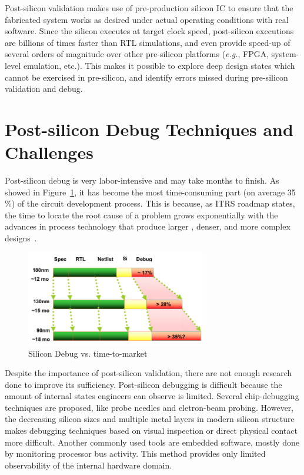\documentclass[12pt,frontmatter,copyright,thesis]{usfmanus}
\newcommand{\eg}{\mbox{{\em e.g.}}}
\begin{document}
Post-silicon validation makes use of pre-production silicon
IC to ensure that the fabricated system
works as desired under actual operating conditions with real
software.  Since the silicon executes at target clock speed,
post-silicon executions are billions of times faster than
RTL simulations, and even provide speed-up of several orders
of magnitude over other pre-silicon platforms (\eg, FPGA,
system-level emulation, etc.).  This makes it possible to
explore deep design states which cannot be exercised in
pre-silicon, and identify errors missed during pre-silicon
validation and debug.  

\section{Post-silicon Debug Techniques and Challenges}

Post-silicon debug is very labor-intensive and may
take months to finish. As showed in Figure~\ref{debugt},
it has become the most time-consuming part (on average 35$\%$) of the
circuit development process. This is because, as ITRS roadmap states, the time to locate the root cause of a problem
grows exponentially with the advances in process
technology that produce larger , denser, and more complex designs~\cite{Abramovici:2006:RDI:1146909.1146916}.
\begin{figure}[h]
\centering
\includegraphics[width=0.7\textwidth]{debugtime.png}
\caption{Silicon Debug vs. time-to-market}
\label{debugt}
\end{figure}

Despite the importance of post-silicon validation, there are not
enough research done to improve its sufficiency.
Post-silicon debugging is difficult because
the amount of internal states engineers can
observe is limited. Several chip-debugging techniques are proposed,
like probe needles and eletron-beam probing.
However, the decreasing silicon sizes and multiple metal layers
in modern silicon structure makes 
debugging techniques based on visual inspection or direct physical contact more difficult\cite{1003792}.
Another commonly used tools are embedded software, mostly done by monitoring
processor bus activity. This method provides only limited observability
of the internal hardware domain\cite{leatherman2003processor}.
\end{document}
